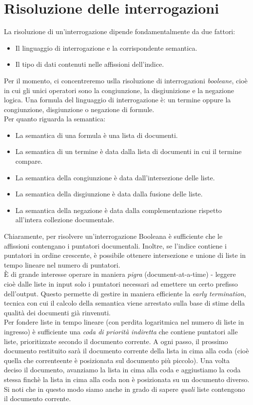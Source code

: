 \section{Risoluzione delle interrogazioni}
La risoluzione di un'interrogazione dipende fondamentalmente da due fattori:
\begin{itemize}
    \item Il linguaggio di interrogazione e la corrispondente semantica.
    \item Il tipo di dati contenuti nelle affissioni dell'indice.
\end{itemize}
Per il momento, ci concentreremo uslla risoluzione di interrogazioni \textit{booleane}, cioè in cui gli unici operatori sono la congiunzione, la disgiunizione e la negazione logica. Una formula del linguaggio di interrogazione è: un termine oppure la congiunzione, disgiunzione o negazione di formule.\\
Per quanto riguarda la semantica:
\begin{itemize}
    \item La semantica di una formula è una lista di documenti.
    \item La semantica di un termine è data dalla lista di documenti in cui il termine compare.
    \item La semantica della congiunzione è data dall'intersezione delle liste.
    \item La semantica della disgiunzione è data dalla fusione delle liste.
    \item La semantica della negazione è data dalla complementazione rispetto all'intera collezione documentale.
\end{itemize}
Chiaramente, per risolvere un'interrogazione Booleana è sufficiente che le affissioni contengano i puntatori documentali. Inoltre, se l'indice contiene i puntatori in ordine crescente, è possibile ottenere intersezione e unione di liste in tempo lineare nel numero di puntatori.\\
È di grande interesse operare in maniera \textit{pigra} (document-at-a-time) - leggere cioè dalle liste in input solo i puntatori necessari ad emettere un certo prefisso dell'output. Questo permette di gestire in maniera efficiente la \textit{early termination}, tecnica con cui il calcolo della semantica viene arrestato sulla base di stime della qualità dei documenti già rinvenuti.\\
Per fondere liste in tempo lineare (con perdita logaritmica nel numero di liste in ingresso) è sufficiente una \textit{coda di priorità indiretta} che contiene puntatori alle liste, prioritizzate secondo il documento corrente. A ogni passo, il prossimo documento restituito sarà il documento corrente della lista in cima alla coda (cioè quella che correnteente è posizionata sul documento più piccolo). Una volta deciso il documento, avanziamo la lista in cima alla coda e aggiustiamo la coda stessa finchè la lista in cima alla coda non è posizionata su un documento diverso. Si noti che in questo modo siamo anche in grado di sapere \textit{quali} liste contengono il documento corrente.\\
